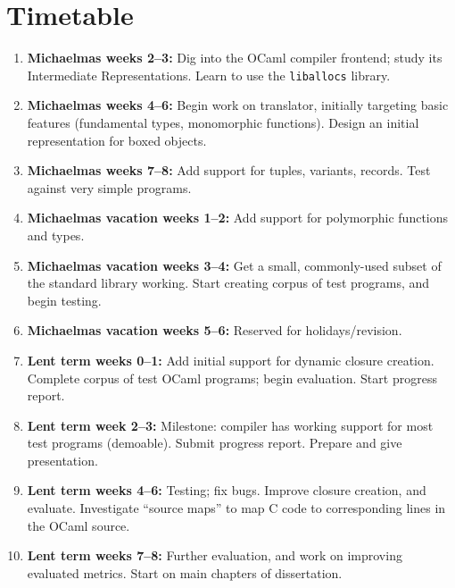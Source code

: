 \documentclass[12pt,twoside,a4paper]{article}
\begin{document}
\section*{Timetable}

\begin{enumerate}
\item \textbf{Michaelmas weeks 2--3:}
  Dig into the OCaml compiler frontend; study its Intermediate Representations. Learn to use the \lstinline{liballocs} library.

\item \textbf{Michaelmas weeks 4--6:}
  Begin work on translator, initially targeting basic features (fundamental types, monomorphic functions).
  Design an initial representation for boxed objects.

\item \textbf{Michaelmas weeks 7--8:}
  Add support for tuples, variants, records. Test against very simple programs.

\item \textbf{Michaelmas vacation weeks 1--2:}
  Add support for polymorphic functions and types.

\item \textbf{Michaelmas vacation weeks 3--4:}
  Get a small, commonly-used subset of the standard library working.
  Start creating corpus of test programs, and begin testing.

\item \textbf{Michaelmas vacation weeks 5--6:}
  Reserved for holidays/revision.

\item \textbf{Lent term weeks 0--1:}
  Add initial support for dynamic closure creation.
  Complete corpus of test OCaml programs; begin evaluation.
  Start progress report.

\item \textbf{Lent term week 2--3:}
  Milestone: compiler has working support for most test programs (demoable).
  Submit progress report.
  Prepare and give presentation.

\item \textbf{Lent term weeks 4--6:}
  Testing; fix bugs. Improve closure creation, and evaluate.
  Investigate ``source maps'' to map C code to corresponding lines in the OCaml source.

\item \textbf{Lent term weeks 7--8:}
  Further evaluation, and work on improving evaluated metrics.
  Start on main chapters of dissertation.


\end{enumerate}
\end{document}
